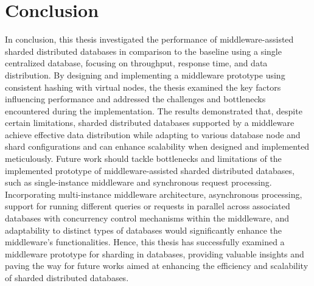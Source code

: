 
\chapter{Conclusion}\label{ch:conclusion}
In conclusion, this thesis investigated the performance of middleware-assisted sharded distributed databases in comparison to the baseline using a single centralized database, focusing on throughput, response time, and data distribution. By designing and implementing a middleware prototype using consistent hashing with virtual nodes, the thesis examined the key factors influencing performance and addressed the challenges and bottlenecks encountered during the implementation. The results demonstrated that, despite certain limitations, sharded distributed databases supported by a middleware achieve effective data distribution while adapting to various database node and shard configurations and can enhance scalability when designed and implemented meticulously. Future work should tackle bottlenecks and limitations of the implemented prototype of middleware-assisted sharded distributed databases, such as single-instance middleware and synchronous request processing. Incorporating multi-instance middleware architecture, asynchronous processing, support for running different queries or requests in parallel across associated databases with concurrency control mechanisms within the middleware, and adaptability to distinct types of databases would significantly enhance the middleware's functionalities. Hence, this thesis has successfully examined a middleware prototype for sharding in databases, providing valuable insights and paving the way for future works aimed at enhancing the efficiency and scalability of sharded distributed databases.